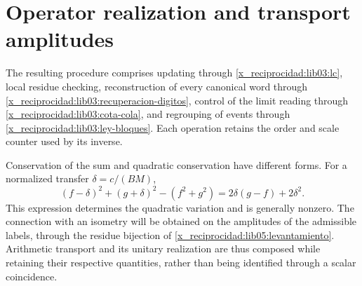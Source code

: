 \section{Operator realization and transport amplitudes}
\label{x_reciprocidad:lib03:operativo}

The resulting procedure comprises updating through
\eqref{x_reciprocidad:lib03:lc}, local residue checking, reconstruction of
every canonical word through \eqref{x_reciprocidad:lib03:recuperacion-digitos},
control of the limit reading through \eqref{x_reciprocidad:lib03:cota-cola}, and
regrouping of events through \eqref{x_reciprocidad:lib03:ley-bloques}. Each
operation retains the order and scale counter used by its
inverse.

Conservation of the sum and quadratic conservation have different
forms. For a normalized transfer
\(\delta=c/(BM)\),
\begin{equation}
 (f-\delta)^2+(g+\delta)^2-(f^2+g^2)
 =2\delta(g-f)+2\delta^2.
 \label{x_reciprocidad:lib03:variacion-cuadratica}
\end{equation}
This expression determines the quadratic variation and is generally
nonzero. The connection with an isometry will be obtained on the
amplitudes of the admissible labels, through the residue bijection of
\cref{x_reciprocidad:lib05:levantamiento}. Arithmetic transport and its
unitary realization are thus composed while retaining their respective
quantities, rather than being identified through a scalar coincidence.
